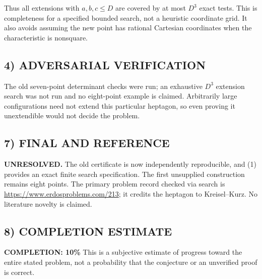 Thus all extensions with $a,b,c\le D$ are covered by at most $D^3$ exact
tests. This is completeness for a specified bounded search, not a heuristic
coordinate grid. It also avoids assuming the new point has rational
Cartesian coordinates when the characteristic is nonsquare.

\subsection*{4) ADVERSARIAL VERIFICATION}
The old seven-point determinant checks were run; an exhaustive $D^3$
extension search was not run and no eight-point example is claimed.
Arbitrarily large configurations need not extend this particular heptagon,
so even proving it unextendible would not decide the problem.

\subsection*{7) FINAL AND REFERENCE}
\textbf{UNRESOLVED.} The old certificate is now independently reproducible,
and (1) provides an exact finite search specification. The first unsupplied
construction remains eight points. The primary problem record checked via
search is \url{https://www.erdosproblems.com/213}; it credits the heptagon
to Kreisel--Kurz. No literature novelty is claimed.

\subsection*{8) COMPLETION ESTIMATE}
\textbf{COMPLETION: 10\%}
This is a subjective estimate of progress toward the entire stated problem, not a probability that the conjecture or an unverified proof is correct.
